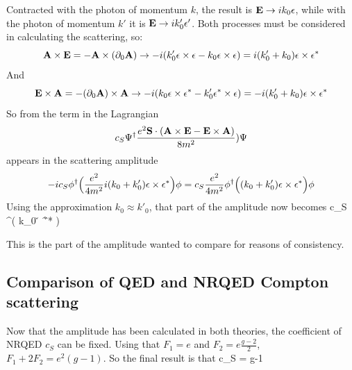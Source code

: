 Contracted with the photon of momentum $k$, the result is $\mathbf{E} \to i k_0 \mathbf{\epsilon}$, while with the photon of momentum $k'$ it is $\mathbf{E} \to i k'_0 \mathbf{\epsilon'}$.  Both processes must be considered in calculating the scattering, so:
\[
	\mathbf{A} \times \mathbf{E} = - \mathbf{A} \times (\partial_0 \mathbf{A})
		\to 
	-i(k_0' \mathbf{\epsilon} \times \mathbf{\epsilon} - k_0 \mathbf{\epsilon} \times \mathbf{\epsilon} ) = i ( k_0' + k_0) \mathbf{\epsilon} \times \mathbf{\epsilon}^*
\]
And
\[
	\mathbf{E} \times \mathbf{A} = - (\partial_0 \mathbf{A}) \times  \mathbf{A}
		\to 
	-i( k_0 \mathbf{\epsilon} \times \mathbf{\epsilon^*} - k_0' \mathbf{\epsilon^*} \times \mathbf{\epsilon} ) = -i ( k_0' + k_0) \mathbf{\epsilon} \times \mathbf{\epsilon^*}
\]
So from the term in the Lagrangian 
\[
 c_S \Psi^\dagger \frac{ e^2 \mathbf{S} \cdot ( \mathbf{A} \times \mathbf{E} - \mathbf{E} \times \mathbf{A} )}{8m^2} ) \Psi
\]
appears in the scattering amplitude
\[
  -i c_S \phi^\dagger  \Big ( \frac{e^2}{4m^2}    i(k_0 + k_0')    \mathbf{\epsilon} \times \mathbf{\epsilon^*} \Big ) \phi
	=
     c_S \frac{e^2}{4m^2} \phi^\dagger  \Big ( (k_0 + k_0')    \mathbf{\epsilon} \times \mathbf{\epsilon^*} \Big ) \phi
\]
Using the approximation $k_0 \approx k'_0$, that part of the amplitude now becomes
\beq \label{eq:Sh:ComptNR}
     c_S  \phi^\dagger  \Big ( k_0    \v{\epsilon} \times \v{\epsilon^*} \Big ) \phi
\eeq


This is the part of the amplitude wanted to compare for reasons of consistency.
	

\subsection{Comparison of QED and NRQED Compton scattering}
Now that the amplitude has been calculated in both theories, the coefficient of NRQED $c_S$ can be fixed.  Using that $F_1 = e$ and $F_2 = e\frac{g-2}{2}$, $F_1 + 2F_2 = e^2(g-1)$.
So the final result is that 
\beq
	c_S = g-1
\eeq
 


